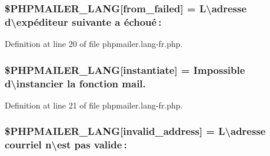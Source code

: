 \subsubsection[{\texorpdfstring{\$\+P\+H\+P\+M\+A\+I\+L\+E\+R\+\_\+\+L\+A\+NG}{$PHPMAILER_LANG}}]{\setlength{\rightskip}{0pt plus 5cm}\$P\+H\+P\+M\+A\+I\+L\+E\+R\+\_\+\+L\+A\+NG\mbox{[}\textquotesingle{}from\+\_\+failed\textquotesingle{}\mbox{]} = \textquotesingle{}L\textbackslash{}\textquotesingle{}adresse d\textbackslash{}\textquotesingle{}expéditeur suivante {\bf a} échoué \+: \textquotesingle{}}\hypertarget{phpmailer_8lang-fr_8php_adf832ae12155a09be077c6d5e4fd7e22}{}\label{phpmailer_8lang-fr_8php_adf832ae12155a09be077c6d5e4fd7e22}


Definition at line 20 of file phpmailer.\+lang-\/fr.\+php.

\subsubsection[{\texorpdfstring{\$\+P\+H\+P\+M\+A\+I\+L\+E\+R\+\_\+\+L\+A\+NG}{$PHPMAILER_LANG}}]{\setlength{\rightskip}{0pt plus 5cm}\$P\+H\+P\+M\+A\+I\+L\+E\+R\+\_\+\+L\+A\+NG\mbox{[}\textquotesingle{}instantiate\textquotesingle{}\mbox{]} = \textquotesingle{}Impossible d\textbackslash{}\textquotesingle{}instancier la fonction mail.\textquotesingle{}}\hypertarget{phpmailer_8lang-fr_8php_ad58dde16780f4770ccf4dd282ea1f5ad}{}\label{phpmailer_8lang-fr_8php_ad58dde16780f4770ccf4dd282ea1f5ad}


Definition at line 21 of file phpmailer.\+lang-\/fr.\+php.

\subsubsection[{\texorpdfstring{\$\+P\+H\+P\+M\+A\+I\+L\+E\+R\+\_\+\+L\+A\+NG}{$PHPMAILER_LANG}}]{\setlength{\rightskip}{0pt plus 5cm}\$P\+H\+P\+M\+A\+I\+L\+E\+R\+\_\+\+L\+A\+NG\mbox{[}\textquotesingle{}invalid\+\_\+address\textquotesingle{}\mbox{]} = \textquotesingle{}L\textbackslash{}\textquotesingle{}adresse courriel n\textbackslash{}\textquotesingle{}est pas valide \+: \textquotesingle{}}\hypertarget{phpmailer_8lang-fr_8php_a42d61bcea4c79599ecb44fd062f54d47}{}\label{phpmailer_8lang-fr_8php_a42d61bcea4c79599ecb44fd062f54d47}


